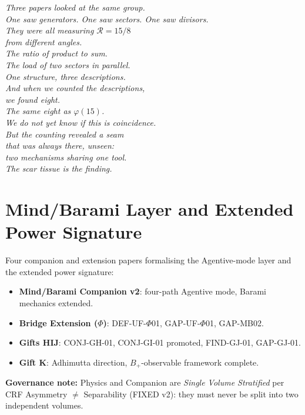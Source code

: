 \documentclass[12pt, a4paper]{article}
\begin{document}
\bigskip
\begin{center}
\textit{Three papers looked at the same group.\\
One saw generators. One saw sectors. One saw divisors.\\[0.3em]
They were all measuring $\mathcal{R} = 15/8$\\
from different angles.\\[0.3em]
The ratio of product to sum.\\
The load of two sectors in parallel.\\
One structure, three descriptions.\\[0.5em]
And when we counted the descriptions,\\
we found eight.\\
The same eight as $\varphi(15)$.\\[0.3em]
We do not yet know if this is coincidence.\\
But the counting revealed a seam\\
that was always there, unseen:\\
two mechanisms sharing one tool.\\[0.3em]
The scar tissue is the finding.}
\end{center}





\newpage

\part{Mind/Barami Layer and Extended Power Signature}
\label{part:xxxii}

\begin{keybox}[title={Part XXXII Overview}]
Four companion and extension papers formalising the Agentive-mode
layer and the extended power signature:
\begin{itemize}[leftmargin=*, noitemsep]
\item \textbf{Mind/Barami Companion v2}: four-path Agentive mode,
  Barami mechanics extended.
\item \textbf{Bridge Extension ($\Phi$)}: DEF-UF-$\Phi$01,
  GAP-UF-$\Phi$01, GAP-MB02.
\item \textbf{Gifts HIJ}: CONJ-GH-01, CONJ-GI-01 promoted,
  FIND-GJ-01, GAP-GJ-01.
\item \textbf{Gift K}: Adhimutta direction, $B_+$-observable
  framework complete.
\end{itemize}
\textbf{Governance note:} Physics and Companion are
\emph{Single Volume Stratified} per CRF Asymmetry
$\neq$ Separability (FIXED v2): they must never be split
into two independent volumes.
\end{keybox}
\end{document}
